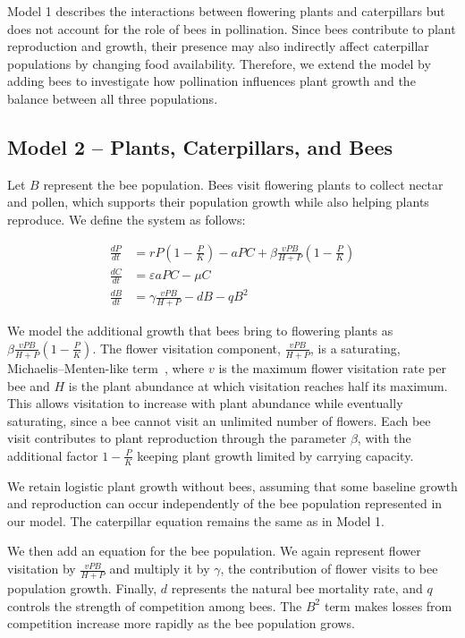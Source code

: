 \documentclass[11pt]{amsart}
\begin{document}
Model 1 describes the interactions between flowering plants and caterpillars but does not account for the role of bees in pollination. Since bees contribute to plant reproduction and growth, their presence may also indirectly affect caterpillar populations by changing food availability. Therefore, we extend the model by adding bees to investigate how pollination influences plant growth and the balance between all three populations.

\subsection{Model 2 -- Plants, Caterpillars, and Bees}

Let $B$ represent the bee population. Bees visit flowering plants to collect nectar and pollen, which supports their population growth while also helping plants reproduce. We define the system as follows:

\[
\begin{aligned}
\frac{dP}{dt} &= rP\left(1-\frac{P}{K}\right)-aPC
+\beta\frac{vPB}{H+P}\left(1-\frac{P}{K}\right) \\[6pt]
\frac{dC}{dt} &= \varepsilon aPC-\mu C \\[6pt]
\frac{dB}{dt} &= \gamma\frac{vPB}{H+P}-dB-qB^2
\end{aligned}
\]

We model the additional growth that bees bring to flowering plants as $\beta\frac{vPB}{H+P}\left(1-\frac{P}{K}\right)$. The flower visitation component, $\frac{vPB}{H+P}$, is a saturating, Michaelis--Menten-like term~\cite{mcpeek2022}, where $v$ is the maximum flower visitation rate per bee and $H$ is the plant abundance at which visitation reaches half its maximum. This allows visitation to increase with plant abundance while eventually saturating, since a bee cannot visit an unlimited number of flowers. Each bee visit contributes to plant reproduction through the parameter $\beta$, with the additional factor $1-\frac{P}{K}$ keeping plant growth limited by carrying capacity.

We retain logistic plant growth without bees, assuming that some baseline growth and reproduction can occur independently of the bee population represented in our model. The caterpillar equation remains the same as in Model 1.

We then add an equation for the bee population. We again represent flower visitation by $\frac{vPB}{H+P}$ and multiply it by $\gamma$, the contribution of flower visits to bee population growth. Finally, $d$ represents the natural bee mortality rate, and $q$ controls the strength of competition among bees. The $B^2$ term makes losses from competition increase more rapidly as the bee population grows.
\end{document}
